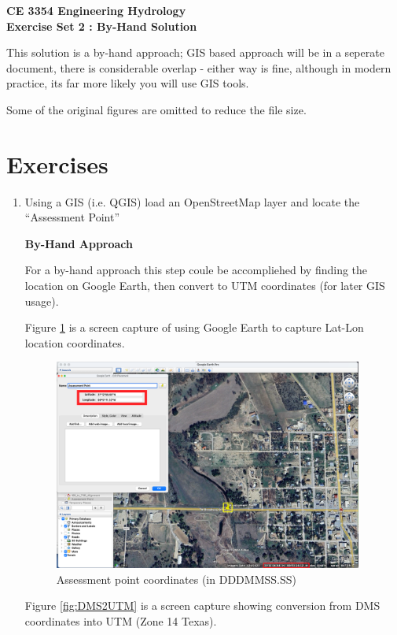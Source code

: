 \documentclass[12pt]{article}
\begin{document}
\begin{center}
{\textbf{{ CE 3354 Engineering Hydrology} \\ {Exercise Set 2 : By-Hand Solution}}}
\end{center}

This solution is a by-hand approach; GIS based approach will be in a seperate document, there is considerable overlap - either way is fine, although in modern practice, its far more likely you will use GIS tools.  

Some of the original figures are omitted to reduce the file size.

\section*{\small{Exercises}}

\begin{enumerate}
\item Using a GIS (i.e. QGIS) load an OpenStreetMap layer and locate the ``Assessment Point'' 

\textbf{By-Hand Approach}

For a by-hand approach this step coule be accompliehed by finding the location on Google Earth, then convert to UTM coordinates (for later GIS usage).

Figure \ref{fig:GEProLocate} is a screen capture of using Google Earth to capture Lat-Lon location coordinates.

\begin{figure}[h!] %
   \centering
   \includegraphics[width=4in]{GEProLatLon.png} 
   \caption{Assessment point coordinates (in DDDMMSS.SS)}
   \label{fig:GEProLocate}
\end{figure}

Figure \ref{fig:DMS2UTM} is a screen capture showing conversion from DMS coordinates into UTM (Zone 14 Texas).


\end{enumerate}
\end{document}
